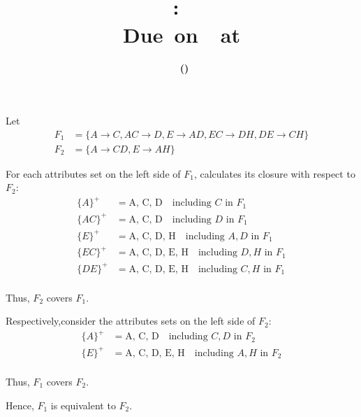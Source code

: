 \documentclass[12pt,letterpaper,titlepage,en-US]{article}
\title{
    \vspace{2in}
    \textmd{\textbf{\hmwkClassName \\\hmwkClass:\ \hmwkTitle}}\\
    \normalsize\vspace{0.1in}\small{Due\ on\ \DTMusedate{DueDate}\ at \DTMusetime{DueDate} }\\
    \vspace{0.1in}\large{\textit{\hmwkClassInstructor}}
    \vspace{3in}
}
\author{\textbf{\hmwkAuthorName\ \footnotesize{(\hmwkAuthorNetID)}} \\ \hmwkAuthorUTDEmail}
\date{}
\begin{document}
\maketitle


\pagebreak

\begin{homeworkProblem}
Let
\begin{align*}
    F_1 &= \{A \rightarrow C, AC \rightarrow D, E \rightarrow AD, EC \rightarrow DH, DE \rightarrow CH\} \\
    F_2 &= \{A \rightarrow CD, E \rightarrow AH\}
\end{align*}

For each attributes set on the left side of $F_1$, calculates its closure with respect to $F_2$:
\begin{align*}
    \{A\}^+ &= \text{A, C, D} \quad \text{including $C$ in $F_1$}\\
    \{AC\}^+ &= \text{A, C, D} \quad \text{including $D$ in $F_1$}\\
    \{E\}^+ &= \text{A, C, D, H} \quad \text{including $A, D$ in $F_1$}\\
    \{EC\}^+ &= \text{A, C, D, E, H} \quad \text{including $D, H$ in $F_1$}\\
    \{DE\}^+ &= \text{A, C, D, E, H} \quad \text{including $C, H$ in $F_1$}\\
\end{align*}

Thus, $F_2$ covers $F_1$.

Respectively,consider the attributes sets on the left side of $F_2$:
\begin{align*}
    \{A\}^+ &= \text{A, C, D} \quad \text{including $C, D$ in $F_2$} \\
    \{E\}^+ &= \text{A, C, D, E, H} \quad \text{including $A, H$ in $F_2$} \\
\end{align*}

Thus, $F_1$ covers $F_2$.

Hence, $F_1$ is equivalent to $F_2$.

\end{homeworkProblem}
\end{document}
